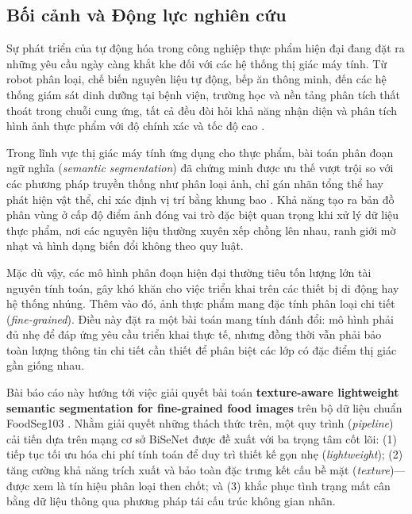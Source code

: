 \subsection{Bối cảnh và Động lực nghiên cứu}
Sự phát triển của tự động hóa trong công nghiệp thực phẩm hiện đại đang đặt ra những yêu cầu ngày càng khắt khe đối với các hệ thống thị giác máy tính. Từ robot phân loại, chế biến nguyên liệu tự động, bếp ăn thông minh, đến các hệ thống giám sát dinh dưỡng tại bệnh viện, trường học và nền tảng phân tích thất thoát trong chuỗi cung ứng, tất cả đều đòi hỏi khả năng nhận diện và phân tích hình ảnh thực phẩm với độ chính xác và tốc độ cao \cite{mahalik2010trends, stemmer2018vision, gao2019smartfridge, wang2019smartrefrigerator}.

Trong lĩnh vực thị giác máy tính ứng dụng cho thực phẩm, bài toán phân đoạn ngữ nghĩa (\emph{semantic segmentation}) đã chứng minh được ưu thế vượt trội so với các phương pháp truyền thống như phân loại ảnh, chỉ gán nhãn tổng thể hay phát hiện vật thể, chỉ xác định vị trí bằng khung bao \cite{long2015fcn, chen2017deeplab}. Khả năng tạo ra bản đồ phân vùng ở cấp độ điểm ảnh đóng vai trò đặc biệt quan trọng khi xử lý dữ liệu thực phẩm, nơi các nguyên liệu thường xuyên xếp chồng lên nhau, ranh giới mờ nhạt và hình dạng biến đổi không theo quy luật.

Mặc dù vậy, các mô hình phân đoạn hiện đại thường tiêu tốn lượng lớn tài nguyên tính toán, gây khó khăn cho việc triển khai trên các thiết bị di động hay hệ thống nhúng. Thêm vào đó, ảnh thực phẩm mang đặc tính phân loại chi tiết (\emph{fine-grained}). Điều này đặt ra một bài toán mang tính đánh đổi: mô hình phải đủ nhẹ để đáp ứng yêu cầu triển khai thực tế, nhưng đồng thời vẫn phải bảo toàn lượng thông tin chi tiết cần thiết để phân biệt các lớp có đặc điểm thị giác gần giống nhau.

Bài báo cáo này hướng tới việc giải quyết bài toán \textbf{texture-aware lightweight semantic segmentation for fine-grained food images} trên bộ dữ liệu chuẩn FoodSeg103 \cite{benchmarkfood}. Nhằm giải quyết những thách thức trên, một quy trình (\emph{pipeline}) cải tiến dựa trên mạng cơ sở BiSeNet \cite{bisenet} được đề xuất với ba trọng tâm cốt lõi: (1) tiếp tục tối ưu hóa chi phí tính toán để duy trì thiết kế gọn nhẹ (\emph{lightweight}); (2) tăng cường khả năng trích xuất và bảo toàn đặc trưng kết cấu bề mặt (\emph{texture})---được xem là tín hiệu phân loại then chốt; và (3) khắc phục tình trạng mất cân bằng dữ liệu thông qua phương pháp tái cấu trúc không gian nhãn.
